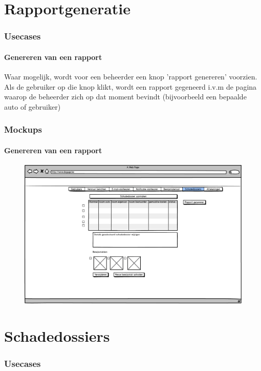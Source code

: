 \documentclass[11pt,a4paper,oneside]{article}
\begin{document}
\part{Rapportgeneratie}
\section{Usecases}
\subsection{Genereren van een rapport}
Waar mogelijk, wordt voor een beheerder een knop 'rapport genereren' voorzien. Als de gebruiker op die knop klikt, wordt een rapport gegeneerd
i.v.m de pagina waarop de beheerder zich op dat moment bevindt (bijvoorbeeld een bepaalde auto of gebruiker)

\section{Mockups}
\subsection{Genereren van een rapport}
\begin{figure}[H]\includegraphics[width=\textwidth]{../../mockups/admin_schadedossiers.png}\end{figure}

\setcounter{section}{0}
\setcounter{subsection}{0}
\part{Schadedossiers}
\section{Usecases}
\end{document}
